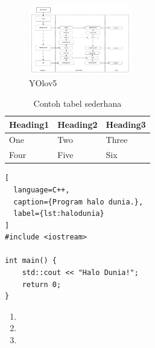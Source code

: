 \begin{figure} [ht]
  \centering
  \includegraphics[width=0.4\textwidth]{gambar/yolov5 structure.png}

  \caption{YOlov5}
  \label{fig:yolov5s}
\end{figure}

\begin{table}
  \caption{Contoh tabel sederhana}
  \label{tab:tabelsederhana}
  \centering
  \begin{tabular}{lll}
    \toprule
    Heading1 & Heading2 & Heading3  \\
    \midrule
    One      & Two      & Three     \\
    Four     & Five     & Six       \\
    \bottomrule
  \end{tabular}
\end{table}

\begin{lstlisting}[
  language=C++,
  caption={Program halo dunia.},
  label={lst:halodunia}
]
#include <iostream>

int main() {
    std::cout << "Halo Dunia!";
    return 0;
}
\end{lstlisting}

\lipsum[12]

\begin{enumerate}
  \item \lipsum[13][1-4]
  \item \lipsum[13][5-8]
  \item \lipsum[13][9-12]
\end{enumerate}

\lipsum[14-15]

